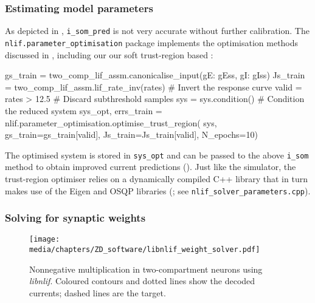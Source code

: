 \subsubsection{Estimating model parameters}
As depicted in , \texttt{i\_som\_pred} is not very accurate without further calibration.
The \texttt{nlif.parameter\_optimisation} package implements the optimisation methods discussed in , including our 
our soft trust-region based \SQP:
\begin{pythoncode}
gs_train = two_comp_lif_assm.canonicalise_input({gE: gEss, gI: gIss})
Js_train = two_comp_lif_assm.lif_rate_inv(rates) # Invert the response curve
valid = rates > 12.5                             # Discard subthreshold samples
sys = sys.condition()                            # Condition the reduced system
sys_opt, errs_train = nlif.parameter_optimisation.optimise_trust_region(
	sys, gs_train=gs_train[valid], Js_train=Js_train[valid], N_epochs=10)
\end{pythoncode}
The optimised system is stored in \texttt{sys\_opt} and can be passed to the above \texttt{i\_som} method to obtain improved current predictions ().
Just like the \nlif simulator, the trust-region optimiser relies on a dynamically compiled C++ library that in turn makes use of the Eigen and OSQP libraries (\cite{stellato2020osqp}; see \texttt{nlif\_solver\_parameters.cpp}).

\subsubsection{Solving for synaptic weights}

\begin{figure}
	\texttt{[image: media/chapters/ZD\_software/libnlif\_weight\_solver.pdf]}
	\caption[Nonnegative multiplication in two-compartment LIF neurons using \emph{libnlif}]{Nonnegative multiplication in two-compartment \LIF neurons using \emph{libnlif}. Coloured contours and dotted lines show the decoded currents; dashed lines are the target.}
\end{figure}

